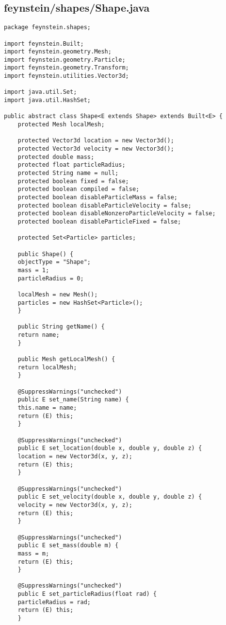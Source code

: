 \subsection*{feynstein/shapes/Shape.java}
\begin{lstlisting}
package feynstein.shapes;

import feynstein.Built;
import feynstein.geometry.Mesh;
import feynstein.geometry.Particle;
import feynstein.geometry.Transform;
import feynstein.utilities.Vector3d;

import java.util.Set;
import java.util.HashSet;

public abstract class Shape<E extends Shape> extends Built<E> {
    protected Mesh localMesh;

    protected Vector3d location = new Vector3d();
    protected Vector3d velocity = new Vector3d();
    protected double mass;
    protected float particleRadius;
    protected String name = null;
    protected boolean fixed = false;
    protected boolean compiled = false;
    protected boolean disableParticleMass = false;
    protected boolean disableParticleVelocity = false;
    protected boolean disableNonzeroParticleVelocity = false;
    protected boolean disableParticleFixed = false;

    protected Set<Particle> particles;

    public Shape() {
	objectType = "Shape";
	mass = 1;
	particleRadius = 0;

	localMesh = new Mesh();
	particles = new HashSet<Particle>();
    }

    public String getName() {
	return name;
    }
	
    public Mesh getLocalMesh() {
	return localMesh;
    }

    @SuppressWarnings("unchecked")
    public E set_name(String name) {
	this.name = name;
	return (E) this;
    }

    @SuppressWarnings("unchecked")
    public E set_location(double x, double y, double z) {
	location = new Vector3d(x, y, z);
	return (E) this;
    }

    @SuppressWarnings("unchecked")
    public E set_velocity(double x, double y, double z) {
	velocity = new Vector3d(x, y, z);
	return (E) this;
    }

    @SuppressWarnings("unchecked")
    public E set_mass(double m) {
	mass = m;
	return (E) this;
    }
	
    @SuppressWarnings("unchecked")
    public E set_particleRadius(float rad) {
	particleRadius = rad;
	return (E) this;
    }


\end{lstlisting}
